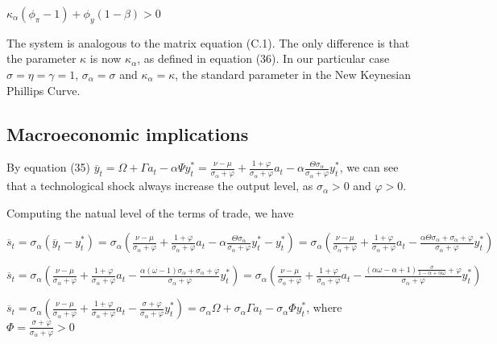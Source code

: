 \documentclass[
]{article}
\begin{document}
\(\kappa_{\alpha} (\phi_\pi-1)+\phi_y(1-\beta)>0\)

\vspace{8pt}

The system is analogous to the matrix equation (C.1). The only
difference is that the parameter \(\kappa\) is now \(\kappa_{\alpha}\),
as defined in equation (36). In our particular case
\(\sigma=\eta=\gamma=1\), \(\sigma_\alpha=\sigma\) and
\(\kappa_\alpha=\kappa\), the standard parameter in the New Keynesian
Phillips Curve.

\vspace{12pt}

\hypertarget{macroeconomic-implications}{%
\subsection{Macroeconomic
implications}\label{macroeconomic-implications}}

By equation (35)
\(\displaystyle \overline{y}_t=\Omega+\Gamma a_t -\alpha \Psi y_t^*=\frac{\nu-\mu}{\sigma_\alpha+\varphi}+\frac{1+\varphi}{\sigma_\alpha+\varphi} a_t -\alpha \frac{\Theta \sigma_\alpha}{\sigma_\alpha+\varphi}y_t^*\),
we can see that a technological shock always increase the output level,
as \(\sigma_\alpha>0\) and \(\varphi>0\).

Computing the natual level of the terms of trade, we have

\(\displaystyle \overline{s}_t=\sigma_\alpha (\overline{y}_t-y_t^*)=\sigma_\alpha \left(\frac{\nu-\mu}{\sigma_\alpha+\varphi}+\frac{1+\varphi}{\sigma_\alpha+\varphi} a_t -\alpha \frac{\Theta \sigma_\alpha}{\sigma_\alpha+\varphi}y_t^* -y_t^* \right)=\sigma_\alpha \left(\frac{\nu-\mu}{\sigma_\alpha+\varphi}+\frac{1+\varphi}{\sigma_\alpha+\varphi} a_t - \frac{\alpha \Theta \sigma_\alpha+\sigma_\alpha+\varphi}{\sigma_\alpha+\varphi}y_t^* \right)\)

\(\displaystyle \overline{s}_t=\sigma_\alpha \left(\frac{\nu-\mu}{\sigma_\alpha+\varphi}+\frac{1+\varphi}{\sigma_\alpha+\varphi} a_t - \frac{\alpha (\omega-1) \sigma_\alpha+\sigma_\alpha+\varphi}{\sigma_\alpha+\varphi}y_t^* \right)=\sigma_\alpha \left(\frac{\nu-\mu}{\sigma_\alpha+\varphi}+\frac{1+\varphi}{\sigma_\alpha+\varphi} a_t - \frac{(\alpha \omega- \alpha+1)\displaystyle \frac{\sigma}{1-\alpha+\alpha \omega} +\varphi}{\sigma_\alpha+\varphi}y_t^* \right)\)

\(\displaystyle \overline{s}_t=\sigma_\alpha \left(\frac{\nu-\mu}{\sigma_\alpha+\varphi}+\frac{1+\varphi}{\sigma_\alpha+\varphi} a_t - \frac{\sigma +\varphi}{\sigma_\alpha+\varphi}y_t^* \right)=\sigma_\alpha \Omega+ \sigma_\alpha \Gamma a_t - \sigma_\alpha \Phi y_t^*\),
where
\(\displaystyle \Phi=\frac{\sigma+\varphi}{\sigma_\alpha+\varphi}>0\)
\end{document}
